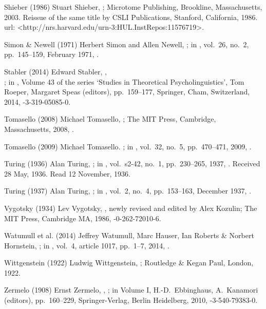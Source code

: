 \biblabel Shieber (1986)
Stuart Shieber,
;
Microtome Publishing, Brookline, Massachusetts, 2003.
Reissue of the same title by
CSLI Publications, Stanford, California, 1986.\\
{\sc url:} \URL<http://nrs.harvard.edu/urn-3:HUL.InstRepos:11576719>.

\biblabel Simon \& Newell (1971)
Herbert Simon and Allen Newell,
;
in ,
 vol.\ 26, no.\ 2, pp.\ 145--159, February 1971,
.

\biblabel Stabler (2014)
Edward Stabler,
,\\
;
in ,
Volume 43 of the series ‘Studies in Theoretical Psycholinguistics’,
Tom Roeper, Margaret Speas (editors),
pp.\ 159--177,
Springer, Cham, Switzerland, 2014,
-3-319-05085-0.

\biblabel Tomasello (2008)
Michael Tomasello,
;
The MIT Press, Cambridge, Massachusetts, 2008,
.

\biblabel Tomasello (2009)
Michael Tomasello.
;
in ,
vol.\ 32, no.\ 5, pp.\ 470--471, 2009,
.

\biblabel Turing (1936)
Alan Turing,
;
in ,
vol.\ s2-42, no.\ 1, pp.\ 230--265, 1937,
.
Received 28 May, 1936. Read 12 November, 1936.

\biblabel Turing (1937)
Alan Turing,
; in
,
vol.\ 2, no.\ 4, pp.\ 153--163, December 1937,
.

\biblabel Vygotsky (1934)
Lev Vygotsky,
,
newly revised and edited by Alex Kozulin;
The MIT Press, Cambridge MA, 1986,
-0-262-72010-6.

\biblabel Watumull et al. (2014)
Jeffrey Watumull, Marc Hauser, Ian Roberts \& Norbert Hornstein,
; in
,
vol.\ 4, article 1017, pp.\ 1--7, 2014,
.

\biblabel Wittgenstein (1922)
Ludwig Wittgenstein,
;
Routledge \& Kegan Paul, London, 1922.

\biblabel Zermelo (1908)
Ernst Zermelo,
,
;
in  Volume I,
H.-D.\ Ebbinghaus, A.\ Kanamori (editors),
pp.\ 160--229,
Springer-Verlag, Berlin Heidelberg, 2010,
-3-540-79383-0.

\endinput
